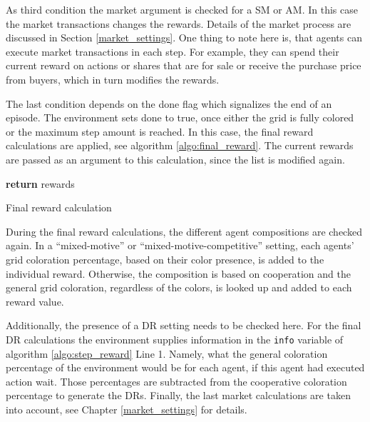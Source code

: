 As third condition the market argument is checked for a SM or AM. In this case the market transactions changes the rewards. Details of the market process are discussed in Section \ref{market_settings}. One thing to note here is, that agents can execute market transactions in each step. For example, they can spend their current reward on actions or shares that are for sale or receive the purchase price from buyers, which in turn modifies the rewards.

The last condition depends on the done flag which signalizes the end of an episode. The environment sets done to true, once either the grid is fully colored or the maximum step amount is reached. In this case, the final reward calculations are applied, see algorithm \ref{algo:final_reward}. The current rewards are passed as an argument to this calculation, since the list is modified again. %

\begin{algorithm}[H]
    \DontPrintSemicolon
    \;
    \;
    \textbf{return} rewards\;
    \caption{Final reward calculation}\label{algo:final_reward}
\end{algorithm}

During the final reward calculations, the different agent compositions are checked again. In a ``mixed-motive'' or ``mixed-motive-competitive'' setting, each agents' grid coloration percentage, based on their color presence, is added to the individual reward. Otherwise, the composition is based on cooperation and the general grid coloration, regardless of the colors, is looked up and added to each reward value. 

Additionally, the presence of a DR setting needs to be checked here. For the final DR calculations the environment supplies information in the \verb|info| variable of algorithm \ref{algo:step_reward} Line 1. Namely, what the general coloration percentage of the environment would be for each agent, if this agent had executed action wait. Those percentages are subtracted from the cooperative coloration percentage to generate the DRs. Finally, the last market calculations are taken into account, see Chapter \ref{market_settings} for details.

